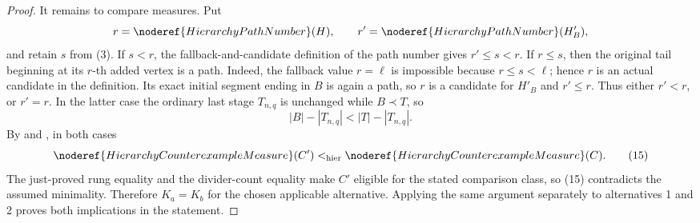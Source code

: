 \begin{proof}
It remains to compare measures.  Put
\[
 r=\noderef{HierarchyPathNumber}(H),\qquad
 r'=\noderef{HierarchyPathNumber}(H'_B),
\]
and retain $s$ from (3).  If $s<r$, the fallback-and-candidate definition
of the path number gives $r'\leq s<r$.  If $r\leq s$, then the original
tail beginning at its $r$-th added vertex is a path.  Indeed, the fallback
value $r=\ell$ is impossible because $r\leq s<\ell$; hence $r$ is an
actual candidate in the definition.  Its exact initial segment ending in
$B$ is again a path, so $r$ is a candidate for $H'_B$ and $r'\leq r$.
Thus either $r'<r$, or $r'=r$.  In the latter case the ordinary last
stage $T_{n,q}$ is unchanged while $B\prec T$, so
\[
 |B|-|T_{n,q}|<|T|-|T_{n,q}|.
\]
By  and
, in both cases
\[
 \noderef{HierarchyCounterexampleMeasure}(C')
 <_{\mathrm{hier}}
 \noderef{HierarchyCounterexampleMeasure}(C).                  \tag{15}
\]
The just-proved rung equality and the divider-count equality make $C'$
eligible for the stated comparison class, so (15) contradicts the
assumed minimality.
Therefore $K_a=K_b$ for the chosen applicable alternative.  Applying the
same argument separately to alternatives 1 and 2 proves both implications
in the statement.
\end{proof}
